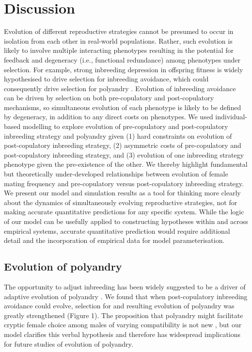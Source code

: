 \documentclass[10pt,letterpaper]{article}
\begin{document}
\section*{Discussion}

Evolution of different reproductive strategies cannot be presumed to occur in isolation from each other in real-world populations. Rather, such evolution is likely to involve multiple interacting phenotypes resulting in the potential for feedback and degeneracy (i.e., functional redundance) among phenotypes under selection. For example, strong inbreeding depression in offspring fitness is widely hypothesised to drive selection for inbreeding avoidance, which could consequently drive selection for polyandry \cite[e.g., ][]{Zeh1997, Jennions2000, Tregenza2002}. Evolution of inbreeding avoidance can be driven by selection on both pre-copulatory and post-copulatory mechanisms, so simultaneous evolution of each phenotype is likely to be defined by degeneracy, in addition to any direct costs on phenotypes. We used individual-based modelling to explore evolution of pre-copulatory and post-copulatory inbreeding strategy and polyandry given (1) hard constraints on evolution of post-copulatory inbreeding strategy, (2) asymmetric costs of pre-copulatory and post-copulatory inbreeding strategy, and (3) evolution of one inbreeding strategy phenotype given the pre-existence of the other. We thereby highlight fundamental but theoretically under-developed relationships between evolution of female mating frequency and pre-copulatory versus post-copulatory inbreeding strategy. We present our model and simulation results as a tool for thinking more clearly about the dynamics of simultaneously evolving reproductive strategies, not for making accurate quantitative predictions for any specific system. While the logic of our model can be usefully applied to constructing hypotheses within and across empirical systems, accurate quantitative prediction would require additional detail and the incorporation of empirical data for model parameterisation.

\subsection*{Evolution of polyandry}

The opportunity to adjust inbreeding has been widely suggested to be a driver of adaptive evolution of polyandry \cite[][]{Tregenza2002, Foerster2003, Akcay2007, Varian-Ramos2012, Kingma2013, Lehtonen2015, Reid2014}. We found that when post-copulatory inbreeding avoidance could evolve, selection for and resulting evolution of polyandry was greatly strengthened (Figure 1). The proposition that polyandry might facilitate cryptic female choice among males of varying compatibility is not new \cite[e.g.,][]{Zeh1997}, but our model clarifies this verbal hypothesis and therefore has widespread implications for future studies of evolution of polyandry. 
\end{document}
